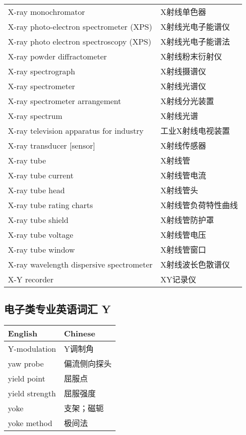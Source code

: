 \documentclass[
]{article}
\begin{document}
\begin{longtable}[]{@{}ll@{}}
X-ray monochromator & X射线单色器 \\
X-ray photo-electron spectrometer (XPS) & X射线光电子能谱仪 \\
X-ray photo electron spectroscopy (XPS) & X射线光电子能谱法 \\
X-ray powder diffractometer & X射线粉末衍射仪 \\
X-ray spectrograph & X射线摄谱仪 \\
X-ray spectrometer & X射线光谱仪 \\
X-ray spectrometer arrangement & X射线分光装置 \\
X-ray spectrum & X射线光谱 \\
X-ray television apparatus for industry & 工业X射线电视装置 \\
X-ray transducer {[}sensor{]} & X射线传感器 \\
X-ray tube & X射线管 \\
X-ray tube current & X射线管电流 \\
X-ray tube head & X射线管头 \\
X-ray tube rating charts & X射线管负荷特性曲线 \\
X-ray tube shield & X射线管防护罩 \\
X-ray tube voltage & X射线管电压 \\
X-ray tube window & X射线管窗口 \\
X-ray wavelength dispersive spectrometer & X射线波长色散谱仪 \\
X-Y recorder & XY记录仪 \\
\bottomrule()
\end{longtable}

\hypertarget{ux7535ux5b50ux7c7bux4e13ux4e1aux82f1ux8bedux8bcdux6c47-y}{%
\subsection{\texorpdfstring{电子类专业英语词汇 Y
}{电子类专业英语词汇 Y }}\label{ux7535ux5b50ux7c7bux4e13ux4e1aux82f1ux8bedux8bcdux6c47-y}}

\begin{longtable}[]{@{}ll@{}}
\toprule()
English & Chinese \\
\midrule()
\endhead
Y-modulation & Y调制角 \\
yaw probe & 偏流侧向探头 \\
yield point & 屈服点 \\
yield strength & 屈服强度 \\
yoke & 支架；磁轭 \\
yoke method & 极间法 \\
\bottomrule()
\end{longtable}
\end{document}
